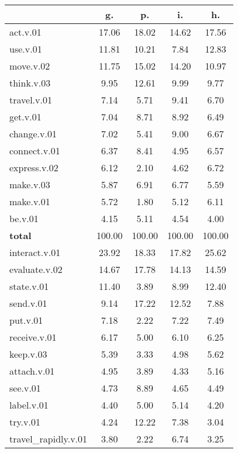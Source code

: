 \begin{table}[h!]
\begin{center}
\begin{tabular}{| l || c | c | c | c |}\hline
 & {\bf g.} & {\bf p.} & {\bf i.} & {\bf h.} \\\hline\hline
act.v.01 & 17.06  & 18.02  & 14.62  & 17.56 \\\hline
use.v.01 & 11.81  & 10.21  & 7.84  & 12.83 \\\hline
move.v.02 & 11.75  & 15.02  & 14.20  & 10.97 \\\hline
think.v.03 & 9.95  & 12.61  & 9.99  & 9.77 \\\hline
travel.v.01 & 7.14  & 5.71  & 9.41  & 6.70 \\\hline
get.v.01 & 7.04  & 8.71  & 8.92  & 6.49 \\\hline
change.v.01 & 7.02  & 5.41  & 9.00  & 6.67 \\\hline
connect.v.01 & 6.37  & 8.41  & 4.95  & 6.57 \\\hline
express.v.02 & 6.12  & 2.10  & 4.62  & 6.72 \\\hline
make.v.03 & 5.87  & 6.91  & 6.77  & 5.59 \\\hline
make.v.01 & 5.72  & 1.80  & 5.12  & 6.11 \\\hline
be.v.01 & 4.15  & 5.11  & 4.54  & 4.00 \\\hline\hline
{{\bf total}} & 100.00  & 100.00  & 100.00  & 100.00 \\\hline\hline\hline
interact.v.01 & 23.92  & 18.33  & 17.82  & 25.62 \\\hline
evaluate.v.02 & 14.67  & 17.78  & 14.13  & 14.59 \\\hline
state.v.01 & 11.40  & 3.89  & 8.99  & 12.40 \\\hline
send.v.01 & 9.14  & 17.22  & 12.52  & 7.88 \\\hline
put.v.01 & 7.18  & 2.22  & 7.22  & 7.49 \\\hline
receive.v.01 & 6.17  & 5.00  & 6.10  & 6.25 \\\hline
keep.v.03 & 5.39  & 3.33  & 4.98  & 5.62 \\\hline
attach.v.01 & 4.95  & 3.89  & 4.33  & 5.16 \\\hline
see.v.01 & 4.73  & 8.89  & 4.65  & 4.49 \\\hline
label.v.01 & 4.40  & 5.00  & 5.14  & 4.20 \\\hline
try.v.01 & 4.24  & 12.22  & 7.38  & 3.04 \\\hline
travel\_rapidly.v.01 & 3.80  & 2.22  & 6.74  & 3.25 \\\hline\hline

\end{tabular}
\end{center}
\end{table}
